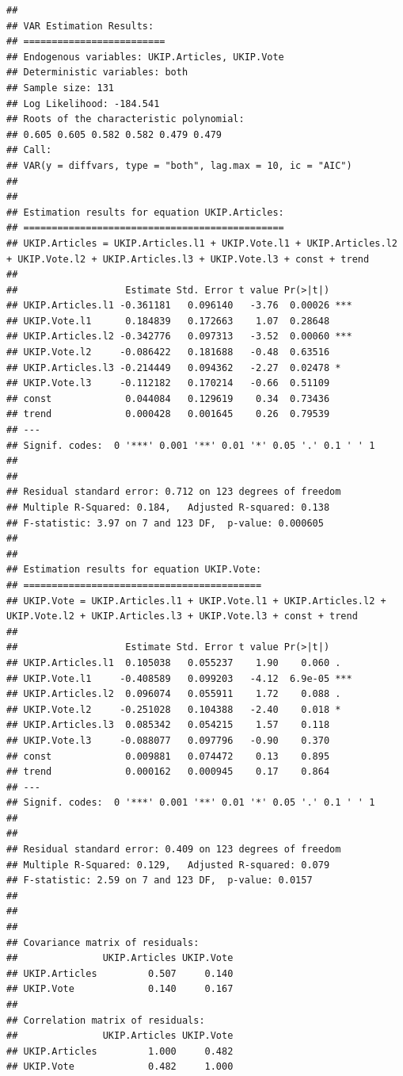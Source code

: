 \documentclass[12pt,article]{article}
\begin{document}
\pagebreak

\begin{verbatim}
## 
## VAR Estimation Results:
## ========================= 
## Endogenous variables: UKIP.Articles, UKIP.Vote 
## Deterministic variables: both 
## Sample size: 131 
## Log Likelihood: -184.541 
## Roots of the characteristic polynomial:
## 0.605 0.605 0.582 0.582 0.479 0.479
## Call:
## VAR(y = diffvars, type = "both", lag.max = 10, ic = "AIC")
## 
## 
## Estimation results for equation UKIP.Articles: 
## ============================================== 
## UKIP.Articles = UKIP.Articles.l1 + UKIP.Vote.l1 + UKIP.Articles.l2 + UKIP.Vote.l2 + UKIP.Articles.l3 + UKIP.Vote.l3 + const + trend 
## 
##                   Estimate Std. Error t value Pr(>|t|)    
## UKIP.Articles.l1 -0.361181   0.096140   -3.76  0.00026 ***
## UKIP.Vote.l1      0.184839   0.172663    1.07  0.28648    
## UKIP.Articles.l2 -0.342776   0.097313   -3.52  0.00060 ***
## UKIP.Vote.l2     -0.086422   0.181688   -0.48  0.63516    
## UKIP.Articles.l3 -0.214449   0.094362   -2.27  0.02478 *  
## UKIP.Vote.l3     -0.112182   0.170214   -0.66  0.51109    
## const             0.044084   0.129619    0.34  0.73436    
## trend             0.000428   0.001645    0.26  0.79539    
## ---
## Signif. codes:  0 '***' 0.001 '**' 0.01 '*' 0.05 '.' 0.1 ' ' 1
## 
## 
## Residual standard error: 0.712 on 123 degrees of freedom
## Multiple R-Squared: 0.184,   Adjusted R-squared: 0.138 
## F-statistic: 3.97 on 7 and 123 DF,  p-value: 0.000605 
## 
## 
## Estimation results for equation UKIP.Vote: 
## ========================================== 
## UKIP.Vote = UKIP.Articles.l1 + UKIP.Vote.l1 + UKIP.Articles.l2 + UKIP.Vote.l2 + UKIP.Articles.l3 + UKIP.Vote.l3 + const + trend 
## 
##                   Estimate Std. Error t value Pr(>|t|)    
## UKIP.Articles.l1  0.105038   0.055237    1.90    0.060 .  
## UKIP.Vote.l1     -0.408589   0.099203   -4.12  6.9e-05 ***
## UKIP.Articles.l2  0.096074   0.055911    1.72    0.088 .  
## UKIP.Vote.l2     -0.251028   0.104388   -2.40    0.018 *  
## UKIP.Articles.l3  0.085342   0.054215    1.57    0.118    
## UKIP.Vote.l3     -0.088077   0.097796   -0.90    0.370    
## const             0.009881   0.074472    0.13    0.895    
## trend             0.000162   0.000945    0.17    0.864    
## ---
## Signif. codes:  0 '***' 0.001 '**' 0.01 '*' 0.05 '.' 0.1 ' ' 1
## 
## 
## Residual standard error: 0.409 on 123 degrees of freedom
## Multiple R-Squared: 0.129,   Adjusted R-squared: 0.079 
## F-statistic: 2.59 on 7 and 123 DF,  p-value: 0.0157 
## 
## 
## 
## Covariance matrix of residuals:
##               UKIP.Articles UKIP.Vote
## UKIP.Articles         0.507     0.140
## UKIP.Vote             0.140     0.167
## 
## Correlation matrix of residuals:
##               UKIP.Articles UKIP.Vote
## UKIP.Articles         1.000     0.482
## UKIP.Vote             0.482     1.000
\end{verbatim}
\end{document}
